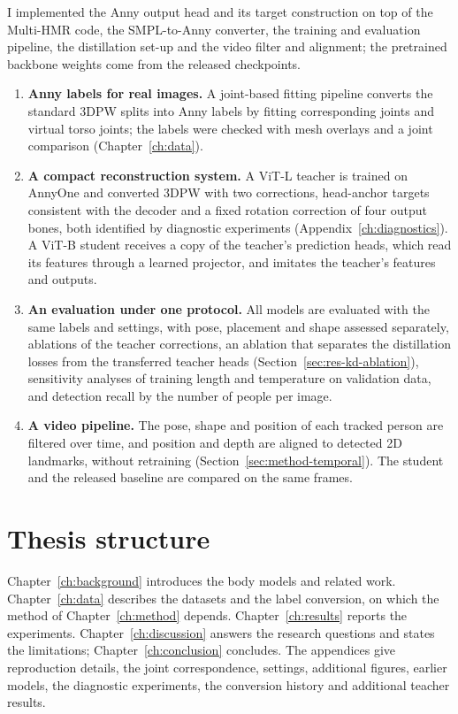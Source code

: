 I implemented the Anny output head and its target construction on top of the
Multi-HMR code, the SMPL-to-Anny converter, the training and evaluation pipeline, the distillation set-up and the
video filter and alignment; the pretrained backbone weights come from the released checkpoints.
\begin{enumerate}
\item \textbf{Anny labels for real images.} A joint-based fitting pipeline converts the standard 3DPW splits into
  Anny labels by fitting corresponding joints and virtual torso joints; the labels were checked with mesh overlays
  and a joint comparison (Chapter~\ref{ch:data}).
\item \textbf{A compact reconstruction system.} A ViT-L teacher is trained on AnnyOne and converted 3DPW with two
  corrections, head-anchor targets consistent with the decoder and a fixed rotation correction of four output bones,
  both identified by diagnostic experiments (Appendix~\ref{ch:diagnostics}). A ViT-B student receives a copy
  of the teacher's prediction heads, which read its features through a learned projector, and imitates the teacher's
  features and outputs.
\item \textbf{An evaluation under one protocol.} All models are evaluated with the same labels and settings, with
  pose, placement and shape assessed separately, ablations of the teacher corrections, an ablation that separates
  the distillation losses from the transferred teacher heads (Section~\ref{sec:res-kd-ablation}), sensitivity
  analyses of training length and temperature on validation data, and detection recall by the number of people per
  image.
\item \textbf{A video pipeline.} The pose, shape and position of each tracked person are filtered over time, and
  position and depth are aligned to detected 2D landmarks, without retraining (Section~\ref{sec:method-temporal}). The student and the released baseline are compared on
  the same frames.
\end{enumerate}

\section{Thesis structure}
\label{sec:intro-outline}

Chapter~\ref{ch:background} introduces the body models and related work. Chapter~\ref{ch:data} describes the
datasets and the label conversion, on which the method of Chapter~\ref{ch:method} depends.
Chapter~\ref{ch:results} reports the experiments. Chapter~\ref{ch:discussion} answers the research questions and states the
limitations; Chapter~\ref{ch:conclusion} concludes. The appendices give reproduction details, the joint
correspondence, settings, additional figures, earlier models, the diagnostic experiments, the conversion history and
additional teacher results.
